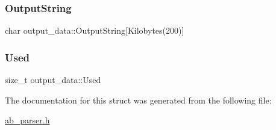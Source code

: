 \mbox{\label{structoutput__data_a4b5cddf8fc02cfb5219eafd71e3b3645}} 
\subsubsection{\texorpdfstring{Output\+String}{OutputString}}
{\footnotesize\ttfamily char output\+\_\+data\+::\+Output\+String\mbox{[}Kilobytes(200)\mbox{]}}

\mbox{\label{structoutput__data_ac960304f0c5df1d42068abe8bb6a362a}} 
\subsubsection{\texorpdfstring{Used}{Used}}
{\footnotesize\ttfamily size\+\_\+t output\+\_\+data\+::\+Used}



The documentation for this struct was generated from the following file\+:\begin{DoxyCompactItemize}
\item 
\hyperlink{ab__parser_8h}{ab\+\_\+parser.\+h}\end{DoxyCompactItemize}
